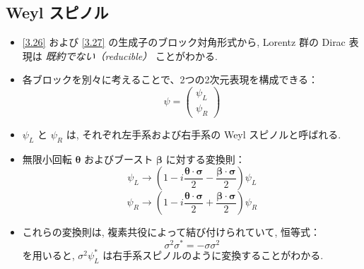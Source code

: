 \documentclass[a4paper,12pt]{article}
\begin{document}
  \subsection*{Weyl スピノル}
  \begin{itemize}
    \item \eqref{3.26} および \eqref{3.27} の生成子のブロック対角形式から, Lorentz 群の Dirac 表現は \textit{既約でない（reducible）} ことがわかる.
    \item 各ブロックを別々に考えることで、2つの2次元表現を構成できる：
    \begin{equation*}
    \psi = \begin{pmatrix} \psi_L \\ \psi_R \end{pmatrix} \tag{3.36}
    \end{equation*}
    \item $\psi_L$ と $\psi_R$ は, それぞれ左手系および右手系の Weyl スピノルと呼ばれる.
    \item 無限小回転 $\boldsymbol{\theta}$ およびブースト $\boldsymbol{\beta}$ に対する変換則：
    \begin{equation*}
    \psi_L \rightarrow \left(1 - i \frac{\boldsymbol{\theta} \cdot \boldsymbol{\sigma}}{2} - \frac{\boldsymbol{\beta} \cdot \boldsymbol{\sigma}}{2} \right) \psi_L
    \end{equation*}
    \begin{equation*}
    \psi_R \rightarrow \left(1 - i \frac{\boldsymbol{\theta} \cdot \boldsymbol{\sigma}}{2} + \frac{\boldsymbol{\beta} \cdot \boldsymbol{\sigma}}{2} \right) \psi_R \tag{3.37}
    \end{equation*}
    \item これらの変換則は, 複素共役によって結び付けられていて, 恒等式：
    \begin{equation*}
    \sigma^2 \sigma^* = -\sigma \sigma^2 \tag{3.38}
    \end{equation*}
    を用いると, $\sigma^2 \psi_L^*$ は右手系スピノルのように変換することがわかる.
    

\end{itemize}
\end{document}
